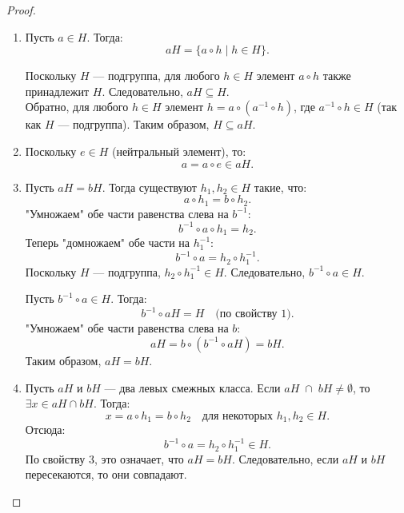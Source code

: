 \begin{proof}
    \leavevmode \nl 
    
    \begin{enumerate}
    \item Пусть \( a \in H \). Тогда:
    \[
    aH = \{ a \circ h \mid h \in H \}.
    \]
    
    Поскольку \( H \) — подгруппа, для любого \( h \in H \) элемент \( a \circ h \) также принадлежит \( H \). Следовательно, \( aH \subseteq H \). \\
    
    Обратно, для любого \( h \in H \) элемент \( h = a \circ (a^{-1} \circ h) \), где \( a^{-1} \circ h \in H \) (так как \( H \) — подгруппа). Таким образом, \( H \subseteq aH \). \\
    

    \item Поскольку \( e \in H \) (нейтральный элемент), то:
    \[
    a = a \circ e \in aH.
    \]

    \item 
    \boxed{\Rightarrow} Пусть \( aH = bH \). Тогда существуют \( h_1, h_2 \in H \) такие, что:
    \[
    a \circ h_1 = b \circ h_2.
    \]
    "Умножаем" \; обе части равенства слева на \( b^{-1} \):
    \[
    b^{-1} \circ a \circ h_1 = h_2.
    \]
    Теперь "домножаем" \; обе части на \( h_1^{-1} \):
    \[
    b^{-1} \circ a = h_2 \circ h_1^{-1}.
    \]
    Поскольку \( H \) — подгруппа, \( h_2 \circ h_1^{-1} \in H \). Следовательно, \( b^{-1} \circ a \in H \).

    
    \boxed{\Leftarrow} Пусть \( b^{-1} \circ a \in H \). Тогда:
    \[
    b^{-1} \circ aH = H \quad \text{(по свойству 1)}.
    \]
    "Умножаем" \; обе части равенства слева на \( b \):
    \[
    aH = b \circ (b^{-1} \circ aH) = bH.
    \]
    Таким образом, \( aH = bH \).

    \item Пусть \( aH \) и \( bH \) — два левых смежных класса. Если \( aH \; \cap \; bH \neq \emptyset \), то \(\exists x \in aH \cap bH \). Тогда:
    \[
    x = a \circ h_1 = b \circ h_2 \quad \text{для некоторых } h_1, h_2 \in H.
    \]
    Отсюда:
    \[
    b^{-1} \circ a = h_2 \circ h_1^{-1} \in H.
    \]
    По свойству 3, это означает, что \( aH = bH \). Следовательно, если \( aH \) и \( bH \) пересекаются, то они совпадают.
    \end{enumerate}
\end{proof}

